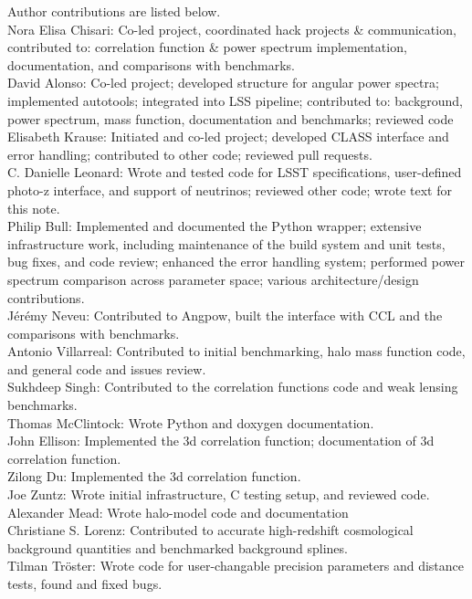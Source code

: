 Author contributions are listed below. \\
Nora Elisa Chisari: Co-led project, coordinated hack projects \& communication, contributed to: correlation function \& power spectrum implementation, documentation, and comparisons with benchmarks. \\
David Alonso: Co-led project; developed structure for angular power spectra; implemented autotools; integrated into LSS pipeline; contributed to: background, power spectrum, mass function, documentation and benchmarks; reviewed code \\
Elisabeth Krause: Initiated and co-led project; developed CLASS interface and error handling; contributed to other code; reviewed pull requests. \\
C. Danielle Leonard: Wrote and tested code for LSST specifications, user-defined photo-z interface, and support of neutrinos; reviewed other code; wrote text for this note. \\
Philip Bull: Implemented and documented the Python wrapper; extensive infrastructure work, including maintenance of the build system and unit tests, bug fixes, and code review; enhanced the error handling system; performed power spectrum comparison across parameter space; various architecture/design contributions. \\
J\'er\'emy Neveu: Contributed to Angpow, built the interface with CCL and the comparisons with benchmarks. \\
Antonio Villarreal: Contributed to initial benchmarking, halo mass function code, and general code and issues review. \\
Sukhdeep Singh: Contributed to the correlation functions code and weak lensing benchmarks. \\
Thomas McClintock: Wrote Python and doxygen documentation. \\
John Ellison: Implemented the 3d correlation function; documentation of 3d correlation function. \\
Zilong Du: Implemented the 3d correlation function. \\
Joe Zuntz: Wrote initial infrastructure, C testing setup, and reviewed code. \\
Alexander Mead: Wrote halo-model code and documentation \\
Christiane S. Lorenz: Contributed to accurate high-redshift cosmological background quantities and benchmarked background splines. \\
Tilman Tr\"oster: Wrote code for user-changable precision parameters and distance tests, found and fixed bugs. \\
